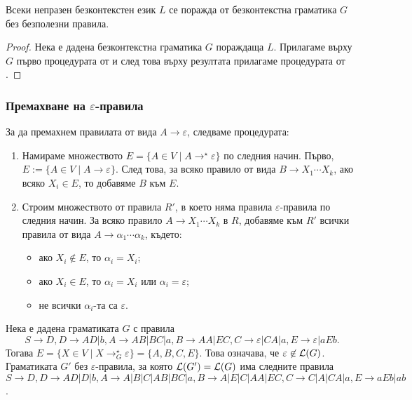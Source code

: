\begin{thm}
  Всеки непразен безконтекстен език $L$ се поражда от безконтекстна граматика $G$
  без безполезни правила.
\end{thm}
\begin{proof}
  Нека е дадена безконтекстна граматика $G$ пораждаща $L$.
  Прилагаме върху $G$ първо процедурата от  и след това върху резултата прилагаме процедурата от .
\end{proof}

\subsubsection*{Премахване на $\varepsilon$-правила}
За да премахнем правилата от вида $A \to \varepsilon$, следваме процедурата:
\begin{enumerate}[1)]
\item 
  Намираме множеството $E = \{A \in V \mid A \to^\star \varepsilon\}$ по следния начин.
  Първо, $E := \{A \in V \mid A \to \varepsilon\}$.
  След това, за всяко правило от вида $B \to X_1\cdots X_k$, 
  ако всяко $X_i \in E$, то добавяме $B$ към $E$.
\item
  Строим множеството от правила $R'$, в което няма правила $\varepsilon$-правила по следния начин.
  За всяко правило $A \to X_1\cdots X_k$ в $R$,
  добавяме към $R'$ всички правила от вида $A \to \alpha_1\cdots\alpha_k$, където:
  \begin{itemize}[-]
  \item 
    ако $X_i \not\in E$, то $\alpha_i = X_i$;
  \item
    ако $X_i \in E$, то $\alpha_i = X_i$ или $\alpha_i = \varepsilon$;
  \item
    не всички $\alpha_i$-та са $\varepsilon$.
  \end{itemize}
\end{enumerate}

\begin{example}
  Нека е дадена граматиката $G$ с правила
  \[S\rightarrow D,D\rightarrow AD|b,A\rightarrow AB|BC|a, B\rightarrow AA|EC,C\rightarrow \varepsilon|CA|a, E\rightarrow \varepsilon|aEb.\]
  Тогава $E = \{X \in V \mid X \rightarrow^\star_G \varepsilon\} = \{A,B,C,E\}$.
  Това означава, че $\varepsilon \not\in \mathcal{L}(G)$.
  Граматиката $G'$ без $\varepsilon$-правила, за която $\mathcal{L}(G') = \mathcal{L}(G)$ има следните правила
  $S \to D, D\to AD|D|b, A \to A|B|C|AB|BC|a,B\to A|E|C|AA|EC, C \to C|A|CA|a, E \to aEb|ab$.
\end{example}

